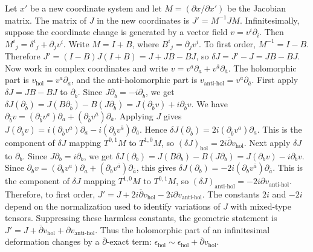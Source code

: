 \documentclass[12pt]{article}
\begin{document}
\begin{solution}
    Let $x'$ be a new coordinate system and let $M=(\partial x/\partial x')$ be the Jacobian matrix. The matrix of $J$ in the new coordinates is $J'=M^{-1}JM$. Infinitesimally, suppose the coordinate change is generated by a vector field $v=v^i\partial_i$. Then $M^i{}_j=\delta^i{}_j+\partial_jv^i$. Write $M=I+B$, where $B^i{}_j=\partial_jv^i$. To first order, $M^{-1}=I-B$. Therefore $J'=(I-B)J(I+B)=J+JB-BJ$, so $\delta J=J'-J=JB-BJ$.
    Now work in complex coordinates and write $v=v^a\partial_a+v^{\overline a}\partial_{\overline a}$. The holomorphic part is $v_{\mathrm{hol}}=v^a\partial_a$, and the anti-holomorphic part is $v_{\mathrm{anti\text{-}hol}}=v^{\overline a}\partial_{\overline a}$.
    First apply $\delta J=JB-BJ$ to $\partial_{\overline b}$. Since $J\partial_{\overline b}=-i\partial_{\overline b}$, we get $\delta J(\partial_{\overline b})=J(B\partial_{\overline b})-B(J\partial_{\overline b})=J(\partial_{\overline b}v)+i\partial_{\overline b}v$.
    We have $\partial_{\overline b}v=(\partial_{\overline b}v^a)\partial_a+(\partial_{\overline b}v^{\overline a})\partial_{\overline a}$. Applying $J$ gives $J(\partial_{\overline b}v)=i(\partial_{\overline b}v^a)\partial_a-i(\partial_{\overline b}v^{\overline a})\partial_{\overline a}$. Hence $\delta J(\partial_{\overline b})=2i(\partial_{\overline b}v^a)\partial_a$. This is the component of $\delta J$ mapping $T^{0,1}M$ to $T^{1,0}M$, so $(\delta J)_{\mathrm{hol}}=2i\overline\partial v_{\mathrm{hol}}$.
    Next apply $\delta J$ to $\partial_b$. Since $J\partial_b=i\partial_b$, we get $\delta J(\partial_b)=J(B\partial_b)-B(J\partial_b)=J(\partial_bv)-i\partial_bv$. Since $\partial_bv=(\partial_bv^a)\partial_a+(\partial_bv^{\overline a})\partial_{\overline a}$, this gives $\delta J(\partial_b)=-2i(\partial_bv^{\overline a})\partial_{\overline a}$. This is the component of $\delta J$ mapping $T^{1,0}M$ to $T^{0,1}M$, so $(\delta J)_{\mathrm{anti\text{-}hol}}=-2i\partial v_{\mathrm{anti\text{-}hol}}$.
    Therefore, to first order, $J'=J+2i\overline\partial v_{\mathrm{hol}}-2i\partial v_{\mathrm{anti\text{-}hol}}$. The constants $2i$ and $-2i$ depend on the normalization used to identify variations of $J$ with mixed-type tensors. Suppressing these harmless constants, the geometric statement is $J'=J+\overline\partial v_{\mathrm{hol}}+\partial v_{\mathrm{anti\text{-}hol}}$.
    Thus the holomorphic part of an infinitesimal deformation changes by a $\overline\partial$-exact term: $\epsilon_{\mathrm{hol}}\sim \epsilon_{\mathrm{hol}}+\overline\partial v_{\mathrm{hol}}$.
\end{solution}
\end{document}
